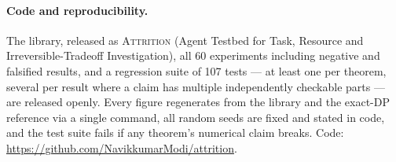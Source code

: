\paragraph{Code and reproducibility.} The library, released as \textsc{Attrition} (Agent Testbed for Task, Resource and Irreversible-Tradeoff Investigation), all 60 experiments including
negative and falsified results, and a regression suite of 107 tests --- at least
one per theorem, several per result where a claim has multiple independently
checkable parts --- are released openly. Every figure regenerates from the
library and the exact-DP reference via a single command, all random seeds are
fixed and stated in code, and the test suite fails if any theorem's numerical
claim breaks. Code: \url{https://github.com/NavikkumarModi/attrition}.

\LONGFORM

